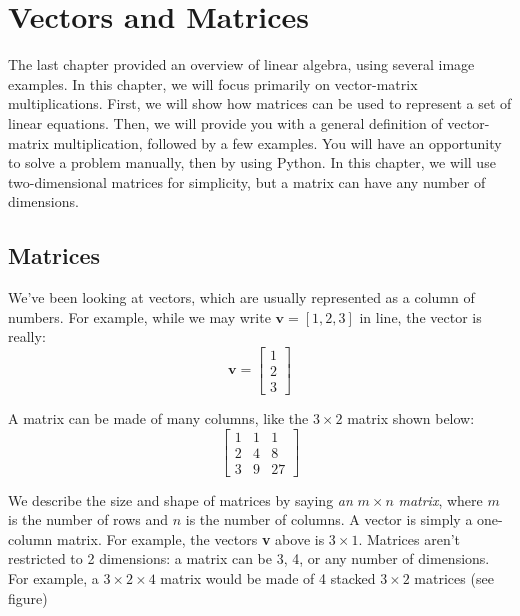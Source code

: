 \chapter{Vectors and Matrices}
  
The last chapter provided an overview of linear algebra, using several image 
examples. In this chapter, we will focus primarily on vector-matrix 
multiplications. First, we will show how matrices can be used to represent a 
set of linear equations. Then, we will provide you with a general definition 
of vector-matrix multiplication, followed by a few examples. You will have an 
opportunity to solve a problem manually, then by using Python. In this 
chapter, we will use two-dimensional matrices for simplicity, but a matrix can 
have any number of dimensions.  

\section{Matrices}
We've been looking at vectors, which are usually represented as a column of 
numbers. For example, while we may write $\mathbf{v} = \left[ 1, 2, 3 \right]$ 
in line, the vector is really:
$$\mathbf{v} = \begin{bmatrix}
1\\
2\\
3
\end{bmatrix}$$

A matrix can be made of many columns, like the $3 \times 2$ matrix shown below:
$$\begin{bmatrix}
1 & 1 & 1\\
2 & 4 & 8\\
3 & 9 & 27
\end{bmatrix}$$

We describe the size and shape of matrices by saying \textit{an }$m \times 
n$\textit{ matrix}, where $m$ is the number of rows and $n$ is the number of 
columns. A vector is simply a one-column matrix. For example, the vectors 
\textbf{v} above is $3 \times 1$. Matrices aren't restricted to 2 dimensions: 
a matrix can be 3, 4, or any number of dimensions. For example, a $3 \times 2 
\times 4$ matrix would be made of 4 stacked $3 \times 2$ matrices (see figure)


\begin{Exercise}[title = {Matrix Dimensions 1}, label = mat_dim1]
\end{Exercise}


